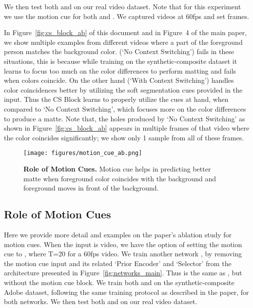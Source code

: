 \documentclass[10pt,twocolumn,letterpaper]{article}
\begin{document}
We then test both  and  on our real video dataset. Note that for this experiment we use the motion cue  for both  and . We captured videos at 60fps and set  frames.

In Figure~\ref{fig:cs_block_ab} of this document and in Figure~4 of the main paper, we show multiple examples from different videos where a part of the foreground person matches the background color.  (`No Context Switching') fails in these situations, this is because while training on the synthetic-composite dataset it learns to focus too much on the color differences to perform matting and fails when colors coincide. On the other hand  (`With Context Switching') handles color coincidences better by utilizing the soft segmentation cues provided in the input. Thus the CS Block learns to properly utilize the cues at hand, when compared to `No Context Switching', which focuses more on the color differences to produce a matte. Note that, the holes produced by `No Context Switching' as shown in Figure~\ref{fig:cs_block_ab} appears in multiple frames of that video where the color coincides significantly; we show only 1 sample from all of these frames.

\begin{figure}[!ht]
	\centering
	\texttt{[image: figures/motion\_cue\_ab.png]}
	\caption{\small \textbf{Role of Motion Cues.} Motion cue helps in predicting better matte when foreground color coincides with the background and foreground moves in front of the background.}
\label{fig:motion_cue_ab}	
\end{figure}

\subsection{Role of Motion Cues}
\label{sec:motion_cue}

Here we provide more detail and examples on the paper's ablation study for motion cues.  When the input is video, we have the option of setting the motion cue to , where T=20 for a 60fps video. We train another network , by removing the motion cue input and its related `Prior Encoder' and `Selector' from the architecture presented in Figure~\ref{fig:networks_main}. Thus  is the same as , but without the motion cue block. We train both  and  on the synthetic-composite Adobe dataset, following the same training protocol as described in the paper, for both networks. We then test both  and  on our real video dataset.
\end{document}
